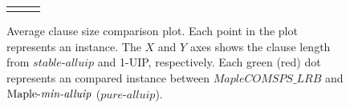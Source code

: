 \documentclass[runningheads]{llncs}
\newcommand{\oneuip}{1-UIP\xspace}
\newcommand{\stablealluip}{\textit{stable-alluip}\xspace}
\newcommand{\allUipPure}{\textit{pure-alluip}\xspace}
\newcommand{\allUipMin}{\textit{min-alluip}\xspace}
\newcommand{\MapleBase}{\textit{MapleCOMSPS\_LRB}}
\newcommand{\MapleIUIPPure}{\text{Maple-\allUipPure}}
\newcommand{\MapleIUIMin}{\text{Maple-\allUipMin}}
\newcommand{\nf}[1]{{\color{red}{#1}}}
\begin{document}
\begin{figure}[t!]
{\begin{tabular}[t]{l c l}
\begin{minipage}[t]{0.5\textwidth}
    \caption{Average clause size comparison plot. Each point in the
      plot represents an instance. The $X$ and $Y$ axes shows the clause
      length from $\stablealluip$ and \oneuip, respectively. Each green (red)
      dot represents an compared instance between $\MapleBase$ and
      $\MapleIUIMin$ ($\allUipPure$).}
      \label{fig:len_compare}
  \end{minipage}

\end{tabular}
}
\end{figure}



\end{document}

